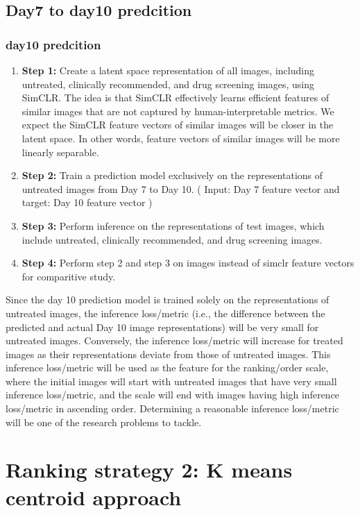 \subsection{Day7 to day10 predcition} \label{subsec:day7-to-day10}
\subsubsection{day10 predcition}
\begin{enumerate}
    \item \textbf{Step 1:} Create a latent space representation of all images, including untreated, clinically recommended, 
    and drug screening images, using SimCLR. 
    The idea is that SimCLR effectively learns efficient features of similar images that are not captured by 
    human-interpretable metrics. We expect the SimCLR feature vectors of similar images will be closer in the latent space. 
    In other words, feature vectors of similar images will be more linearly separable.
  
  \item \textbf{Step 2:} Train a prediction model exclusively on the representations of 
  untreated images from Day 7 to Day 10. ( Input: Day 7 feature vector and target: Day 10 feature vector )

  
  \item \textbf{Step 3:} Perform inference on the representations of test images, which include untreated, clinically recommended, and drug screening images.
  \item \textbf{Step 4:} Perform step 2 and step 3 on images instead of simclr feature vectors for comparitive study.
\end{enumerate}

Since the day 10 prediction model is trained solely on the representations of untreated images, the inference loss/metric 
(i.e., the difference between the predicted and actual Day 10 image representations) will be very small for untreated images.
 Conversely, the inference loss/metric will increase for treated images as their representations deviate from those of untreated images.
This inference loss/metric will be used as the feature for the ranking/order scale, where the initial images will start 
with untreated images that have very small inference loss/metric, and the scale will end with images having high inference loss/metric in ascending order. 
Determining a reasonable inference loss/metric will be one of the research problems to tackle.


\section{Ranking strategy 2: K means centroid approach}

